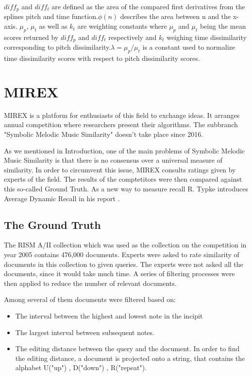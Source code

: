 \documentclass{llncs}
\begin{document}
        $diff_p$ and $diff_t$ are defined as the area of the compared first derivatives from the splines pitch and time function.$ \phi(n)$ describes the area between n and the x-axis. $\mu_p$, $\mu_t$ as well as $k_t$ are weighting constants where $\mu_p$ and $\mu_t$ being the mean scores returned by $diff_p$ and $diff_t$ respectively and $k_t$ weighing time dissimilarity corresponding to pitch dissimilarity.$ \lambda = \mu_p / \mu_t$ is a constant used to normalize time dissimilarity scores with respect to pitch dissimilarity scores.
	\section{MIREX}
		MIREX is a platform for enthusiasts of this field to exchange ideas. It arranges annual competition where researchers present their algorithms. The subbranch "Symbolic Melodic Music Similarity" doesn't take place since 2016. 


		As we mentioned in Introduction, one of the main problems of Symbolic Melodic Music Similarity is that there is no consensus over a universal measure of similarity. In order to circumvent this issue, MIREX consults ratings given by experts of the field. The results of the comptetitors were then compared against this so-called Ground Truth. As a new way to measure recall R. Typke introduces Average Dynamic Recall in his report \cite{three}.       


		\subsection{The Ground Truth}
 		The RISM A/II collection which was used as the collection on the competition in year 2005 contains 476,000 documents. Experts were asked to rate similarity of documents in this collection to given queries. The experts were not asked all the documents, since it would take much time. A series of filtering processes were then applied to reduce the number of relevant documents. 

 		Among several of them documents were filtered based on: 

 		\begin{itemize}
 			\item The interval between the highest and lowest note in the incipit
 			\item The largest interval between subsequent notes.
 			\item The editing distance between the query and the document. In order to find the editing distance, a document is projected onto a string, that contains the alphabet U("up") , D("down") , R("repeat"). 
 		\end{itemize} 
\end{document}
